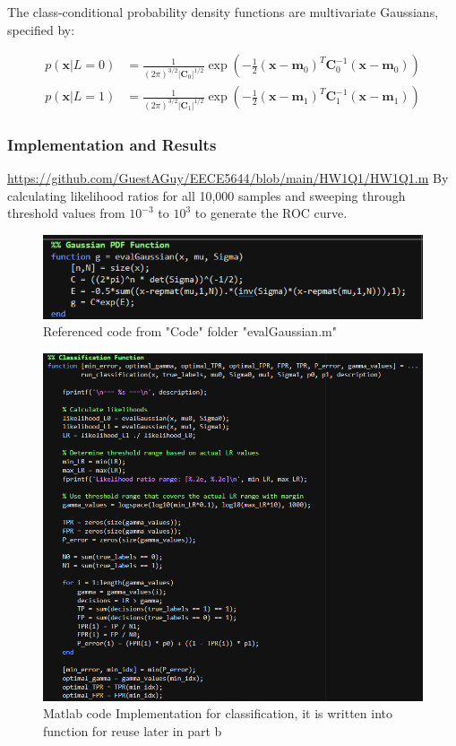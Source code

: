 \documentclass[12pt]{article}
\begin{document}
The class-conditional probability density functions are multivariate Gaussians, specified by:

\begin{align*}
p(\mathbf{x}|L=0) &= \frac{1}{(2\pi)^{3/2}|\mathbf{C}_0|^{1/2}} \exp\left(-\frac{1}{2}(\mathbf{x}-\mathbf{m}_0)^T\mathbf{C}_0^{-1}(\mathbf{x}-\mathbf{m}_0)\right) \\
p(\mathbf{x}|L=1) &= \frac{1}{(2\pi)^{3/2}|\mathbf{C}_1|^{1/2}} \exp\left(-\frac{1}{2}(\mathbf{x}-\mathbf{m}_1)^T\mathbf{C}_1^{-1}(\mathbf{x}-\mathbf{m}_1)\right)
\end{align*}


\subsubsection{Implementation and Results}
\href{https://github.com/GuestAGuy/EECE5644/blob/main/HW1Q1/HW1Q1.m}{https://github.com/GuestAGuy/EECE5644/blob/main/HW1Q1/HW1Q1.m}
By calculating likelihood ratios for all 10,000 samples and sweeping through threshold values from $10^{-3}$ to $10^{3}$ to generate the ROC curve.
\begin{figure}[H]
    \centering
    \includegraphics[width=0.7\linewidth]{matlab_eval_gaussian.png}
    \caption{Referenced code from "Code" folder "evalGaussian.m"}
\end{figure}

\begin{figure}[H]
    \centering
    \includegraphics[width=0.9\linewidth]{matlab_classification_function.png}
    \caption{Matlab code Implementation for classification, it is written into function for reuse later in part b}
\end{figure}
\end{document}
